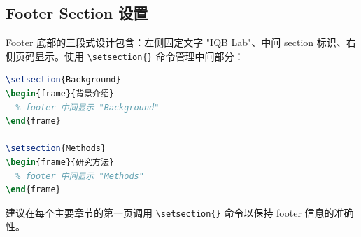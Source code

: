 \subsection{Footer Section 设置}

Footer 底部的三段式设计包含：左侧固定文字 "IQB Lab"、中间 section 标识、右侧页码显示。使用 \lstinline|\setsection{}| 命令管理中间部分：

\begin{lstlisting}[style=blockstyle,language=TeX]
\setsection{Background}
\begin{frame}{背景介绍}
  % footer 中间显示 "Background"
\end{frame}

\setsection{Methods}
\begin{frame}{研究方法}
  % footer 中间显示 "Methods"
\end{frame}
\end{lstlisting}

建议在每个主要章节的第一页调用 \lstinline|\setsection{}| 命令以保持 footer 信息的准确性。